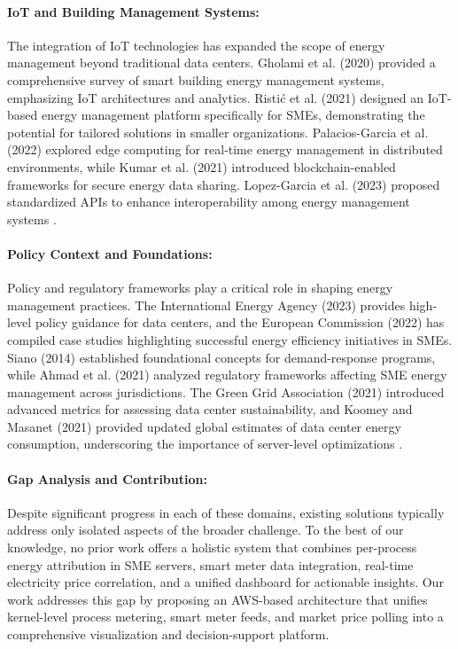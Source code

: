 \paragraph{\textbf{IoT and Building Management Systems:}}
The integration of IoT technologies has expanded the scope of energy management beyond traditional data centers. Gholami et al. (2020) provided a comprehensive survey of smart building energy management systems, emphasizing IoT architectures and analytics. Ristić et al. (2021) designed an IoT-based energy management platform specifically for SMEs, demonstrating the potential for tailored solutions in smaller organizations. Palacios-Garcia et al. (2022) explored edge computing for real-time energy management in distributed environments, while Kumar et al. (2021) introduced blockchain-enabled frameworks for secure energy data sharing. Lopez-Garcia et al. (2023) proposed standardized APIs to enhance interoperability among energy management systems \cite{gholami2020energymanagement,ristic2021iotenergymanagement,palacios2022edge,kumar2021blockchain,lopez2023standardized}.
\paragraph{\textbf{Policy Context and Foundations:}}
Policy and regulatory frameworks play a critical role in shaping energy management practices. The International Energy Agency (2023) provides high-level policy guidance for data centers, and the European Commission (2022) has compiled case studies highlighting successful energy efficiency initiatives in SMEs. Siano (2014) established foundational concepts for demand-response programs, while Ahmad et al. (2021) analyzed regulatory frameworks affecting SME energy management across jurisdictions. The Green Grid Association (2021) introduced advanced metrics for assessing data center sustainability, and Koomey and Masanet (2021) provided updated global estimates of data center energy consumption, underscoring the importance of server-level optimizations \cite{iea2023datacenters,ec2022energyefficiencysmes,siano2014demandresponse,ahmad2021regulatory,greengrid2021beyond,koomey2021does}.
\paragraph{\textbf{Gap Analysis and Contribution:}}
Despite significant progress in each of these domains, existing solutions typically address only isolated aspects of the broader challenge. To the best of our knowledge, no prior work offers a holistic system that combines per-process energy attribution in SME servers, smart meter data integration, real-time electricity price correlation, and a unified dashboard for actionable insights. Our work addresses this gap by proposing an AWS-based architecture that unifies kernel-level process metering, smart meter feeds, and market price polling into a comprehensive visualization and decision-support platform.